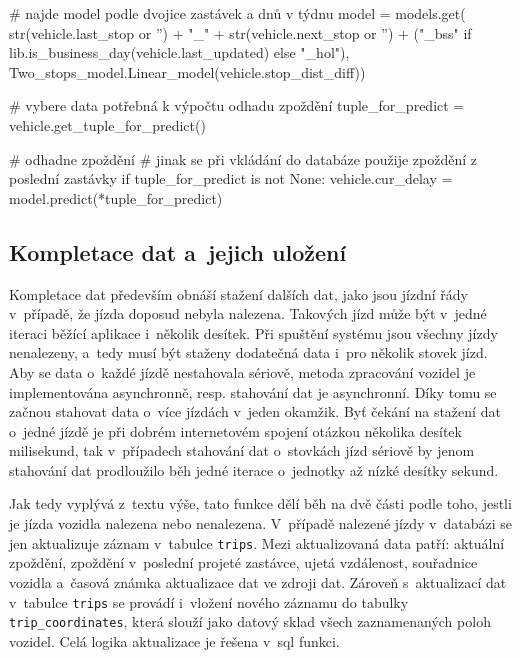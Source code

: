 \begin{code}[frame=none]
# najde model podle dvojice zastávek a dnů v týdnu
model = models.get(
  str(vehicle.last_stop or '') + "_" +
  str(vehicle.next_stop or '') +
  ("_bss" if lib.is_business_day(vehicle.last_updated) else "_hol"),
  Two_stops_model.Linear_model(vehicle.stop_dist_diff))


# vybere data potřebná k výpočtu odhadu zpoždění
tuple_for_predict = vehicle.get_tuple_for_predict()


# odhadne zpoždění
# jinak se při vkládání do databáze použije zpoždění z poslední zastávky
if tuple_for_predict is not None:
  vehicle.cur_delay = model.predict(*tuple_for_predict)
\end{code}


\subsection{Kompletace dat a~jejich uložení}

Kompletace dat především obnáší stažení dalších dat, jako jsou jízdní řády v~případě, že jízda doposud nebyla nalezena. Takových jízd může být v~jedné iteraci běžící aplikace i~několik desítek. Při spuštění systému jsou všechny jízdy nenalezeny, a~tedy musí být staženy dodatečná data i~pro několik stovek jízd. Aby se data o~každé jízdě nestahovala sériově, metoda zpracování vozidel je implementována asynchronně, resp. stahování dat je asynchronní. Díky tomu se začnou stahovat data o~více jízdách v~jeden okamžik. Byť čekání na stažení dat o~jedné jízdě je při dobrém internetovém spojení otázkou několika desítek milisekund, tak v~případech stahování dat o~stovkách jízd sériově by jenom stahování dat prodloužilo běh jedné iterace o~jednotky až nízké desítky sekund.


\bigbreak

Jak tedy vyplývá z~textu výše, tato funkce dělí běh na dvě části podle toho, jestli je jízda vozidla nalezena nebo nenalezena. V~případě nalezené jízdy v~databázi se jen aktualizuje záznam v~tabulce \verb-trips-. Mezi aktualizovaná data patří: aktuální zpoždění, zpoždění v~poslední projeté zastávce, ujetá vzdálenost, souřadnice vozidla a~časová známka aktualizace dat ve zdroji dat. Zároveň s~aktualizací dat v~tabulce \verb-trips- se provádí i~vložení nového záznamu do tabulky \verb-trip_coordinates-, která slouží jako datový sklad všech zaznamenaných poloh vozidel. Celá logika aktualizace je řešena v~\gls{sql} funkci.


